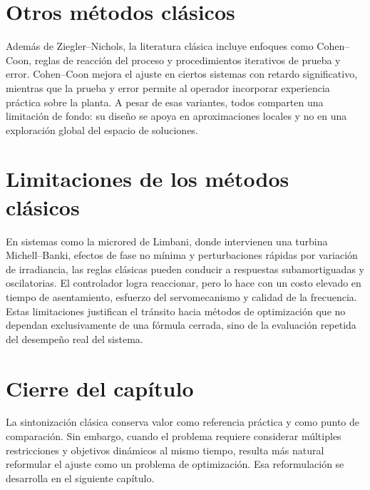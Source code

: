 \section{Otros métodos clásicos}
Además de Ziegler--Nichols, la literatura clásica incluye enfoques como Cohen--Coon, reglas
de reacción del proceso y procedimientos iterativos de prueba y error. Cohen--Coon mejora el
ajuste en ciertos sistemas con retardo significativo, mientras que la prueba y error permite al
operador incorporar experiencia práctica sobre la planta. A pesar de esas variantes, todos
comparten una limitación de fondo: su diseño se apoya en aproximaciones locales y no en una
exploración global del espacio de soluciones.

\section{Limitaciones de los métodos clásicos}
En sistemas como la microred de Limbani, donde intervienen una turbina Michell--Banki,
efectos de fase no mínima y perturbaciones rápidas por variación de irradiancia, las reglas
clásicas pueden conducir a respuestas subamortiguadas y oscilatorias. El controlador logra
reaccionar, pero lo hace con un costo elevado en tiempo de asentamiento, esfuerzo del
servomecanismo y calidad de la frecuencia. Estas limitaciones justifican el tránsito hacia
métodos de optimización que no dependan exclusivamente de una fórmula cerrada, sino de la
evaluación repetida del desempeño real del sistema.

\section{Cierre del capítulo}
La sintonización clásica conserva valor como referencia práctica y como punto de comparación.
Sin embargo, cuando el problema requiere considerar múltiples restricciones y objetivos
dinámicos al mismo tiempo, resulta más natural reformular el ajuste como un problema de
optimización. Esa reformulación se desarrolla en el siguiente capítulo.
